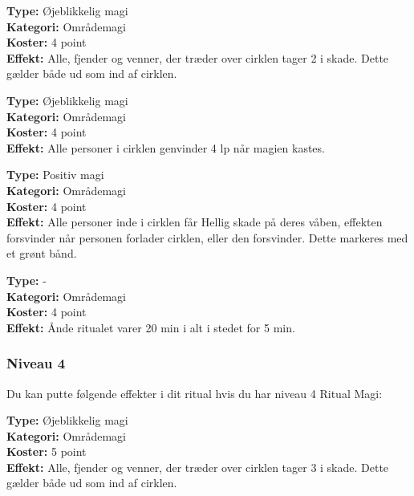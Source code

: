 \begin{ritual*}
\textbf{Type:} Øjeblikkelig magi\\
\textbf{Kategori:} Områdemagi\\
\textbf{Koster:} 4 point\\
\textbf{Effekt:} Alle, fjender og venner, der træder over cirklen tager 2 i skade. Dette gælder både ud som ind af cirklen.
\end{ritual*}

\begin{ritual*}[Helbredelse 2]
\textbf{Type:} Øjeblikkelig magi\\
\textbf{Kategori:} Områdemagi\\
\textbf{Koster:} 4 point\\
\textbf{Effekt:} Alle personer i cirklen genvinder 4 lp når magien kastes.
\end{ritual*}

\begin{ritual*}
\textbf{Type:} Positiv magi\\
\textbf{Kategori:} Områdemagi\\
\textbf{Koster:} 4 point\\
\textbf{Effekt:} Alle personer inde i cirklen får Hellig skade på deres våben, effekten forsvinder når personen forlader cirklen, eller den forsvinder. Dette markeres med et grønt bånd.
\end{ritual*}

\begin{ritual*}
\textbf{Type:} -\\
\textbf{Kategori:} Områdemagi\\
\textbf{Koster:} 4 point\\
\textbf{Effekt:} Ånde ritualet varer 20 min i alt i stedet for 5 min.
\end{ritual*}

\subsubsection*{Niveau 4}
Du kan putte følgende effekter i dit ritual hvis du har niveau 4 Ritual Magi:

\begin{ritual*}
\textbf{Type:} Øjeblikkelig magi\\
\textbf{Kategori:} Områdemagi\\
\textbf{Koster:} 5 point\\
\textbf{Effekt:} Alle, fjender og venner, der træder over cirklen tager 3 i skade. Dette gælder både ud som ind af cirklen.
\end{ritual*}

